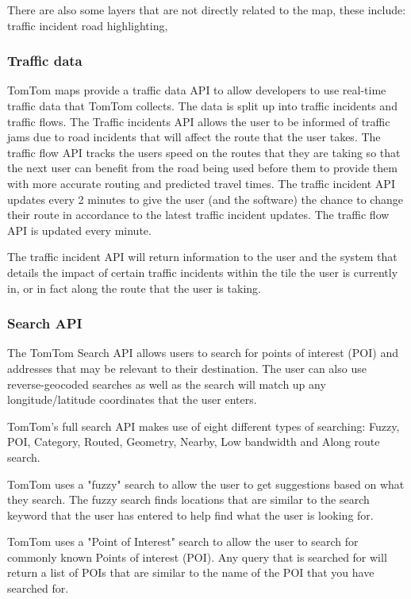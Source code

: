 \documentclass[12pt,a4paper]{article}
\begin{document}
There are also some layers that are not directly related to the map, these include: traffic incident road highlighting,

\subsubsection{Traffic data}
TomTom maps provide a traffic data API to allow developers to use real-time traffic data that TomTom collects. The data is split up into traffic incidents and traffic flows. The Traffic incidents API allows the user to be informed of traffic jams due to road incidents that will affect the route that the user takes. The traffic flow API tracks the users speed on the routes that they are taking so that the next user can benefit from the road being used before them to provide them with more accurate routing and predicted travel times. The traffic incident API updates every 2 minutes to give the user (and the software) the chance to change their route in accordance to the latest traffic incident updates. The traffic flow API is updated every minute.

The traffic incident API will return information to the user and the system that details the impact of certain traffic incidents within the tile the user is currently in, or in fact along the route that the user is taking. 

\subsubsection{Search API}
The TomTom Search API allows users to search for points of interest (POI) and addresses that may be relevant to their destination. The user can also use reverse-geocoded searches as well as the search will match up any longitude/latitude coordinates that the user enters.

TomTom's full search API makes use of eight different types of searching: Fuzzy, POI, Category, Routed, Geometry, Nearby, Low bandwidth and Along route search.

TomTom uses a "fuzzy" search to allow the user to get suggestions based on what they search. The fuzzy search finds locations that are similar to the search keyword that the user has entered to help find what the user is looking for. 

TomTom uses a "Point of Interest" search to allow the user to search for commonly known Points of interest (POI). Any query that is searched for will return a list of POIs that are similar to the name of the POI that you have searched for.
\end{document}
